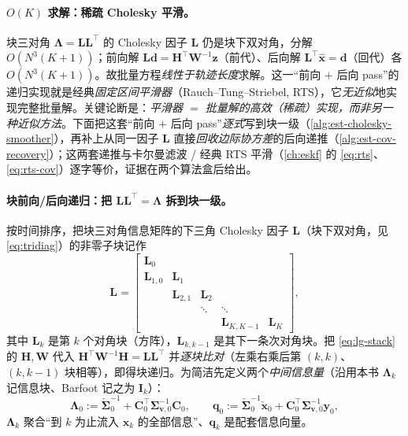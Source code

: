 \paragraph{$O(K)$ 求解：稀疏 Cholesky 平滑。}
块三对角 $\boldsymbol{\Lambda}=\mathbf{L}\mathbf{L}^\top$ 的 Cholesky 因子 $\mathbf{L}$ 仍是块下双对角，分解 $O(N^3(K+1))$；前向解 $\mathbf{L}\mathbf{d}=\mathbf{H}^\top\mathbf{W}^{-1}\mathbf{z}$（前代）、后向解 $\mathbf{L}^\top\hat{\mathbf{x}}=\mathbf{d}$（回代）各 $O(N^3(K+1))$。故批量方程\emph{线性于轨迹长度}求解。这一“前向 $+$ 后向 pass”的递归实现就是经典\emph{固定区间平滑器}（Rauch–Tung–Striebel, RTS），它\emph{无近似}地实现完整批量解\cite{barfoot2024state}。关键论断是：\emph{平滑器 $=$ 批量解的高效（稀疏）实现，而非另一种近似方法}。下面把这套“前向 $+$ 后向 pass”\emph{逐式}写到块一级（\cref{alg:est-cholesky-smoother}），再补上从同一因子 $\mathbf{L}$ 直接\emph{回收边际协方差}的后向递推（\cref{alg:est-cov-recovery}）；这两套递推与卡尔曼滤波 / 经典 RTS 平滑（\cref{ch:eskf} 的 \cref{eq:rts}、\cref{eq:rts-cov}）逐字等价，证据在两个算法盒后给出。

\paragraph{块前向/后向递归：把 $\mathbf{L}\mathbf{L}^\top=\boldsymbol{\Lambda}$ 拆到块一级。}
按时间排序，把块三对角信息矩阵的下三角 Cholesky 因子 $\mathbf{L}$（块下双对角，见 \cref{eq:tridiag}）的非零子块记作
\begin{equation}
  \mathbf{L}=\begin{bmatrix}
    \mathbf{L}_0&&&&\\
    \mathbf{L}_{1,0}&\mathbf{L}_1&&&\\
    &\mathbf{L}_{2,1}&\mathbf{L}_2&&\\
    &&\ddots&\ddots&\\
    &&&\mathbf{L}_{K,K-1}&\mathbf{L}_K
  \end{bmatrix},
  \label{eq:cholesky-blocks}
\end{equation}
其中 $\mathbf{L}_k$ 是第 $k$ 个对角块（方阵），$\mathbf{L}_{k,k-1}$ 是其下一条次对角块。把 \cref{eq:lg-stack} 的 $\mathbf{H},\mathbf{W}$ 代入 $\mathbf{H}^\top\mathbf{W}^{-1}\mathbf{H}=\mathbf{L}\mathbf{L}^\top$ 并\emph{逐块比对}（左乘右乘后第 $(k,k)$、$(k,k\!-\!1)$ 块相等），即得块递归。为简洁先定义两个\emph{中间信息量}（沿用本书 $\boldsymbol{\Lambda}_k$ 记信息块、Barfoot 记之为 $\mathbf{I}_k$\cite{barfoot2024state}）：
\begin{equation}
  \boldsymbol{\Lambda}_0:=\check{\boldsymbol{\Sigma}}_0^{-1}+\mathbf{C}_0^\top\boldsymbol{\Sigma}_{\mathbf{v},0}^{-1}\mathbf{C}_0,\qquad
  \mathbf{q}_0:=\check{\boldsymbol{\Sigma}}_0^{-1}\check{\mathbf{x}}_0+\mathbf{C}_0^\top\boldsymbol{\Sigma}_{\mathbf{v},0}^{-1}\mathbf{y}_0,
  \label{eq:cholesky-init}
\end{equation}
$\boldsymbol{\Lambda}_k$ 聚合“到 $k$ 为止流入 $\mathbf{x}_k$ 的全部信息”、$\mathbf{q}_k$ 是配套信息向量。


